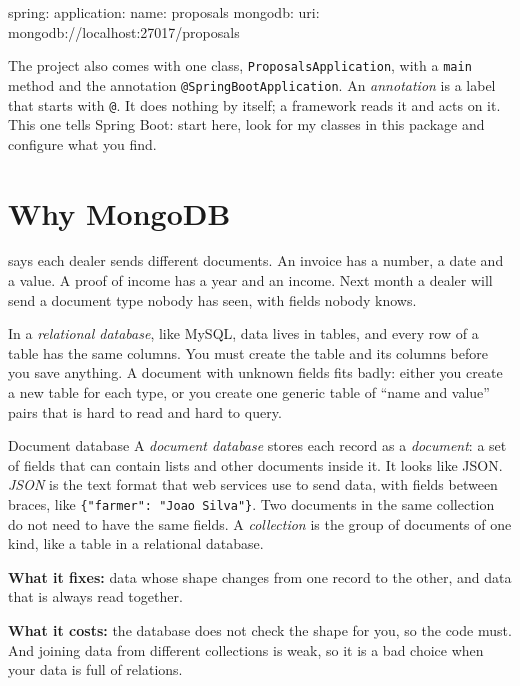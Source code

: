 \begin{code}[language={}]
spring:
  application:
    name: proposals
  mongodb:
    uri: mongodb://localhost:27017/proposals
\end{code}

The project also comes with one class, \texttt{ProposalsApplication}, with a
\texttt{main} method and the annotation \texttt{@SpringBootApplication}. An
\emph{annotation} is a label that starts with \texttt{@}. It does nothing by
itself; a framework reads it and acts on it. This one tells Spring Boot: start
here, look for my classes in this package and configure what you find.

\section{Why MongoDB}

 says each dealer sends different documents. An invoice has a
number, a date and a value. A proof of income has a year and an income. Next
month a dealer will send a document type nobody has seen, with fields nobody
knows.

In a \emph{relational database}, like MySQL, data lives in tables, and every
row of a table has the same columns. You must create the table and its
columns before you save anything. A document with unknown fields fits badly:
either you create a new table for each type, or you create one generic table
of ``name and value'' pairs that is hard to read and hard to query.

\begin{concept}{Document database}
A \emph{document database} stores each record as a \emph{document}: a set of
fields that can contain lists and other documents inside it. It looks like
JSON. \emph{JSON} is the text format that web services use to send data, with
fields between braces, like \texttt{\{"farmer": "Joao Silva"\}}. Two documents
in the same collection do not need to have the same fields. A
\emph{collection} is the group of documents of one kind, like a table in a
relational database.

\textbf{What it fixes:} data whose shape changes from one record to the
other, and data that is always read together.

\textbf{What it costs:} the database does not check the shape for you, so the
code must. And joining data from different collections is weak, so it is a
bad choice when your data is full of relations.
\end{concept}

